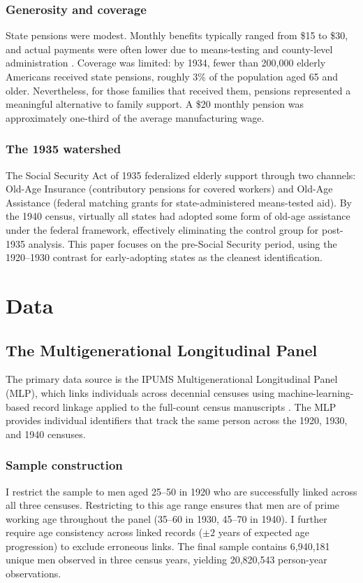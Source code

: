 \documentclass[12pt]{article}
\begin{document}
\subsubsection*{Generosity and coverage} State pensions were modest. Monthly benefits typically ranged from \$15 to \$30, and actual payments were often lower due to means-testing and county-level administration \citep{quadagno1984}. Coverage was limited: by 1934, fewer than 200,000 elderly Americans received state pensions, roughly 3\% of the population aged 65 and older. Nevertheless, for those families that received them, pensions represented a meaningful alternative to family support. A \$20 monthly pension was approximately one-third of the average manufacturing wage.

\subsubsection*{The 1935 watershed} The Social Security Act of 1935 federalized elderly support through two channels: Old-Age Insurance (contributory pensions for covered workers) and Old-Age Assistance (federal matching grants for state-administered means-tested aid). By the 1940 census, virtually all states had adopted some form of old-age assistance under the federal framework, effectively eliminating the control group for post-1935 analysis. This paper focuses on the pre-Social Security period, using the 1920--1930 contrast for early-adopting states as the cleanest identification.

\section{Data}

\subsection{The Multigenerational Longitudinal Panel}

The primary data source is the IPUMS Multigenerational Longitudinal Panel (MLP), which links individuals across decennial censuses using machine-learning-based record linkage applied to the full-count census manuscripts \citep{abramitzky2021, ruggles2024}. The MLP provides individual identifiers that track the same person across the 1920, 1930, and 1940 censuses.

\subsubsection*{Sample construction} I restrict the sample to men aged 25--50 in 1920 who are successfully linked across all three censuses. Restricting to this age range ensures that men are of prime working age throughout the panel (35--60 in 1930, 45--70 in 1940). I further require age consistency across linked records ($\pm 2$ years of expected age progression) to exclude erroneous links. The final sample contains 6,940,181 unique men observed in three census years, yielding 20,820,543 person-year observations.
\end{document}
